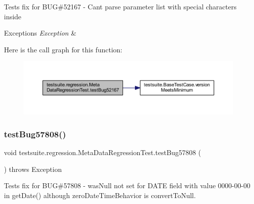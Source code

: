 Tests fix for B\+UG\#52167 -\/ Can\textquotesingle{}t parse parameter list with special characters inside


\begin{DoxyExceptions}{Exceptions}
{\em Exception} & \\
\hline
\end{DoxyExceptions}
Here is the call graph for this function\+:
\nopagebreak
\begin{figure}[H]
\begin{center}
\leavevmode
\includegraphics[width=350pt]{classtestsuite_1_1regression_1_1_meta_data_regression_test_a9fe48a9548719aa95df0a85252333e6c_cgraph}
\end{center}
\end{figure}
\mbox{\label{classtestsuite_1_1regression_1_1_meta_data_regression_test_ade987f06121aa11b35ee8860ae893a51}} 
\subsubsection{\texorpdfstring{test\+Bug57808()}{testBug57808()}}
{\footnotesize\ttfamily void testsuite.\+regression.\+Meta\+Data\+Regression\+Test.\+test\+Bug57808 (\begin{DoxyParamCaption}{ }\end{DoxyParamCaption}) throws Exception}

Tests fix for B\+UG\#57808 -\/ was\+Null not set for D\+A\+TE field with value 0000-\/00-\/00 in get\+Date() although zero\+Date\+Time\+Behavior is convert\+To\+Null.


